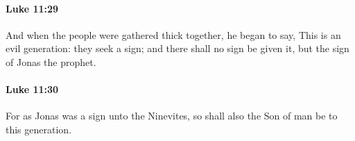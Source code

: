 		\paragraph{Luke 11:29} %
			\label{LUKE-11-29}

			And when the people were gathered thick together, he began to say, This is an evil generation: they seek a sign; and there shall no sign be given it, but the sign of Jonas the prophet.

			\begin{framed}
			\scriptsize
				\begin{compactdesc}
					\item[SBLG] 
				\end{compactdesc}
			\end{framed}

		\paragraph{Luke 11:30} %
			\label{LUKE-11-30}

			For as Jonas was a sign unto the Ninevites, so shall also the Son of man be to this generation.

